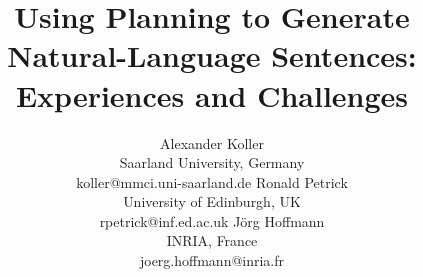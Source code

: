 \documentclass[letterpaper]{article}
\begin{document}
\title{Using Planning to Generate Natural-Language Sentences:\\
  Experiences and Challenges}

\author{
Alexander Koller \\ Saarland University, Germany \\ koller@mmci.uni-saarland.de
\And
Ronald Petrick \\ University of Edinburgh, UK \\ rpetrick@inf.ed.ac.uk
\And
J\"org Hoffmann \\ INRIA, France \\ joerg.hoffmann@inria.fr
}

\maketitle












\end{document}
